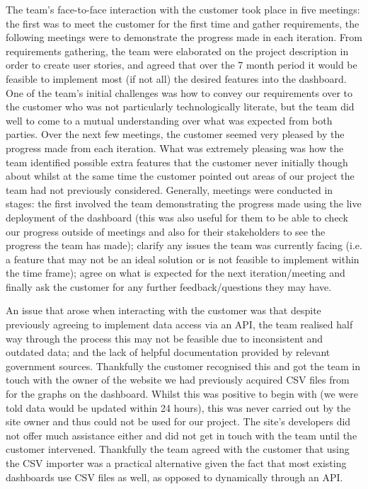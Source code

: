\documentclass{l3proj}
\begin{document}
The team's face-to-face interaction with the customer took place in five meetings: the first was to meet the customer
for the first time and gather requirements, the following meetings were to demonstrate the progress made in each
iteration. From requirements gathering, the team were elaborated on the project description in order to create user stories,
and agreed that over the 7 month period it would be feasible to implement most (if not all) the desired features into the
dashboard. One of the team's initial challenges was how to convey our requirements over to the customer who was not particularly
technologically literate, but the team did well to come to a mutual understanding over what was expected from both parties.
Over the next few meetings, the customer seemed very pleased by the progress made from each iteration. What was extremely
pleasing was how the team identified possible extra features that the customer never initially though about whilst at the
same time the customer pointed out areas of our project the team had not previously considered. Generally, meetings
were conducted in stages: the first involved the team demonstrating the progress made using the live deployment of the
dashboard (this was also useful for them to be able to check our progress outside of meetings and also for their
stakeholders to see the progress the team has made); clarify any issues the team was currently facing (i.e. a feature
that may not be an ideal solution or is not feasible to implement within the time frame); agree on what is expected
for the next iteration/meeting and finally ask the customer for any further feedback/questions they may have.

An issue that arose when interacting with the customer was that despite previously agreeing to implement data access
via an API, the team realised half way through the process this may not be feasible due to inconsistent and outdated
data; and the lack of helpful documentation provided by relevant government sources. Thankfully the customer recognised
this and got the team in touch with the owner of the website we had previously acquired CSV files from for the graphs on
the dashboard. Whilst this was positive to begin with (we were told data would be updated within 24 hours), this was
never carried out by the site owner and thus could not be used for our project. The site's developers did not offer much
assistance either and did not get in touch with the team until the customer intervened. Thankfully the team agreed with
the customer that using the CSV importer was a practical alternative given the fact that most existing dashboards use
CSV files as well, as opposed to dynamically through an API.
\end{document}
